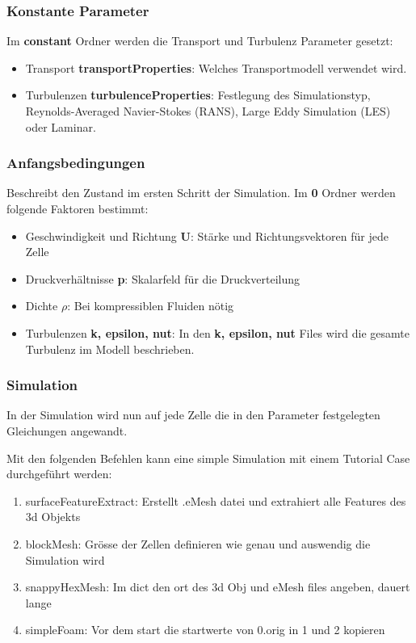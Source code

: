 \subsubsection{Konstante Parameter\label{openfoam:section:Konstante Parameter}}
Im \textbf{constant} Ordner werden die Transport und Turbulenz Parameter gesetzt:
\begin{itemize}
    \item Transport \textbf{transportProperties}: Welches Transportmodell verwendet wird.
    \item Turbulenzen \textbf{turbulenceProperties}: Festlegung des Simulationstyp, Reynolds-Averaged Navier-Stokes (RANS), Large Eddy Simulation (LES) oder Laminar.
\end{itemize}

\subsubsection{Anfangsbedingungen \label{openfoam:section:Anfangsbedingungen}}
Beschreibt den Zustand im ersten Schritt der Simulation. Im \textbf{0} Ordner werden folgende Faktoren bestimmt:
\begin{itemize}
    \item Geschwindigkeit und Richtung \textbf{U}: Stärke und Richtungsvektoren für jede Zelle
    \item Druckverhältnisse \textbf{p}: Skalarfeld für die Druckverteilung
    \item Dichte $\rho$: Bei kompressiblen Fluiden nötig %
    \item Turbulenzen \textbf{k, epsilon, nut}: In den \textbf{k, epsilon, nut} Files wird die gesamte Turbulenz im Modell beschrieben.  
\end{itemize}

\subsubsection{Simulation\label{openfoam:section:Simulation}}
In der Simulation wird nun auf jede Zelle die in den Parameter festgelegten Gleichungen angewandt. 

Mit den folgenden Befehlen kann eine simple Simulation mit einem Tutorial Case durchgeführt werden:

\begin{enumerate}
    \item surfaceFeatureExtract: Erstellt .eMesh datei und extrahiert alle Features des 3d Objekts
    \item blockMesh: Grösse der Zellen definieren wie genau und auswendig die Simulation wird
    \item snappyHexMesh: Im dict den ort des 3d Obj und eMesh files angeben, dauert lange
    \item simpleFoam: Vor dem start die startwerte von 0.orig in 1 und 2 kopieren
\end{enumerate}


